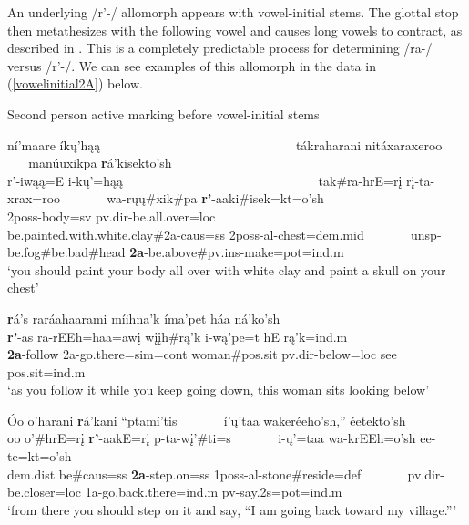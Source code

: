 \label{rglottal}

An underlying /r'-/ allomorph appears with vowel-initial stems. The glottal stop then metathesizes with the following vowel and causes long vowels to contract, as described in . This is a completely predictable process for determining /ra-/ versus /r'-/. We can see examples of this allomorph in the data in (\ref{vowelinitial2A}) below.


\begin{exe}
\item\label{vowelinitial2A} Second person active marking before vowel-initial stems

	\begin{xlist}
	
	\item \glll ní'maare íkų'hąą ~ ~ ~ ~ ~ ~ ~ ~ ~ ~ ~ ~ ~ ~ ~ ~ ~ ~ tákraharani nitáxaraxeroo ~ ~ ~ ~ manúuxikpa \textbf{r}á'kisekto'sh\\
	r'-iwąą=E i-kų'=hąą ~ ~ ~ ~ ~ ~ ~ ~ ~ ~ ~ ~ ~ ~ ~ ~ ~ ~ tak\#ra-hrE=rį rį-ta-xrax=roo ~ ~ ~ ~  wa-rųų\#xik\#pa \textbf{r'}-aaki\#isek=kt=o'sh\\
	2poss-\textnormal{body}=sv pv.dir-\textnormal{be.all.over}=loc ~ ~ ~ ~ ~ ~ ~ ~ ~ ~ ~ ~ ~ ~ ~ ~ ~ ~  \textnormal{be.painted.with.white.clay}\#2a-caus=ss 2poss-al-\textnormal{chest}=dem.mid ~ ~ ~ ~ unsp-\textnormal{be.fog}\#\textnormal{be.bad}\#\textnormal{head} \textbf{2a}-\textnormal{be.above}\#pv.ins-\textnormal{make}=pot=ind.m\\
	\glt `you should paint your body all over with white clay and paint a skull on your chest' \citep[98]{hollow1973b}
	
	\item \glll \textbf{r}á's raráahaarami míihna'k íma'pet háa ná'ko'sh\\
	\textbf{r'}-as ra-rEEh=haa=awį wįįh\#rą'k i-wą'pe=t hE rą'k=ind.m\\
	\textbf{2a}-\textnormal{follow} 2a-\textnormal{go.there}=sim=cont \textnormal{woman}\#pos.sit pv.dir-\textnormal{below}=loc \textnormal{see} pos.sit=ind.m\\
	\glt `as you follow it while you keep going down, this woman sits looking below' \citep[82]{hollow1973a}
	
	\item \glll Óo o'harani \textbf{r}á'kani ``ptamí'tis ~ ~ ~ ~ í'ų'taa wakeréeho'sh,'' éetekto'sh\\
	oo o'\#hrE=rį \textbf{r'}-aakE=rį p-ta-wį'\#ti=s ~ ~ ~ ~ i-ų'=taa wa-krEEh=o'sh ee-te=kt=o'sh\\
	dem.dist \textnormal{be}\#caus=ss \textbf{2a}-\textnormal{step.on}=ss 1poss-al-\textnormal{stone}\#\textnormal{reside}=def ~ ~ ~ ~ pv.dir-\textnormal{be.closer}=loc 1a-\textnormal{go.back.there}=ind.m pv-\textnormal{say}.2s=pot=ind.m\\
	\glt `from there you should step on it and say, ``I am going back toward my village.''' \citep[227]{hollow1973b}
	

\end{xlist}
\end{exe}
